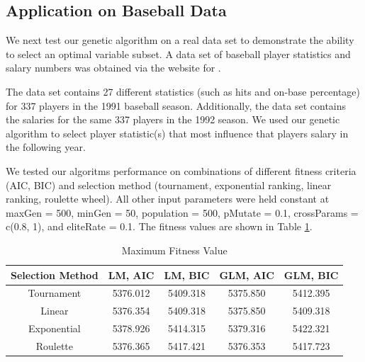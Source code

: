 \documentclass{article}
\begin{document}

\subsection{Application on Baseball Data}\label{s3.2}
We next test our genetic algorithm on a real data set to demonstrate the ability to select an optimal variable subset.  A data set of baseball player statistics and salary numbers was obtained via the website for \citet{compute}.

The data set contains 27 different statistics (such as hits and on-base percentage) for 337 players in the 1991 baseball season.  Additionally, the data set contains the salaries for the same 337 players in the 1992 season.  We used our genetic algorithm to select player statistic(s) that most influence that players salary in the following year.

We tested our algoritms performance on combinations of different fitness criteria (AIC, BIC) and selection method (tournament, exponential ranking, linear ranking, roulette wheel).  All other input parameters were held constant at maxGen = 500, minGen = 50, population = 500, pMutate = 0.1, crossParams = c(0.8, 1), and  eliteRate = 0.1.  The fitness values are shown in Table \ref{table:7}.

\begin{table}[htp]
    \centering
    \caption{Maximum Fitness Value}

\begin{tabular}{ |c|c|c|c|c|  }

 \hline
 Selection Method & LM, AIC & LM, BIC & GLM, AIC & GLM, BIC\\
 \hline
 Tournament &  5376.012   & 5409.318 & 5375.850  & 5412.395\\
 Linear & 5376.354 & 5409.318  & 5375.850 & 5409.318\\
 Exponential & 5378.926 & 5414.315 & 5379.316 & 5422.321\\
 Roulette   & 5376.365 & 5417.421 & 5376.353 & 5417.723\\
 \hline
\end{tabular}
    \label{table:7}
\end{table}
\end{document}

